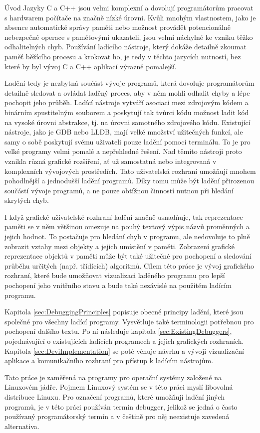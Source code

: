 \documentclass[bc,male,python,dept460]{diploma}						%
\newcommand{\parspace}[1][]{
	\ifthenelse{\isempty{#1}}{\vspace{5mm}}{\vspace{#1}}
	\par
}
\begin{document}
\begin{section}{Úvod}
	Jazyky C a C++ jsou velmi komplexní a dovolují programátorům pracovat s hardwarem počítače na značně nízké úrovni. Kvůli mnohým vlastnostem,
	jako je absence automatické správy paměti nebo možnost provádět potencionálně nebezpečné operace s paměťovými ukazateli, jsou velmi náchylné ke vzniku
	těžko odhalitelných chyb. Používání ladícího nástroje, který dokáže detailně zkoumat paměť běžícího procesu a krokovat ho, je tedy v těchto jazycích nutností,
	bez které by byl vývoj C a C++ aplikací výrazně pomalejší.

	\parspace Ladění tedy je nezbytná součást vývoje programů, která dovoluje programátorům detailně sledovat a ovládat laděný proces, aby v něm mohli odhalit
	chyby a lépe pochopit jeho průběh. Ladící nástroje vytváří asociaci mezi zdrojovým kódem a binárním spustitelným
	souborem a poskytují tak tvůrci kódu možnost ladit kód na vysoké úrovni abstrakce, tj. na úrovni samotného zdrojového kódu.
	Existující nástroje, jako je GDB nebo LLDB, mají velké množství užitečných funkcí, ale samy o sobě poskytují svému uživateli pouze ladění
	pomocí terminálu. To je pro velké programy velmi pomalé a nepřehledné řešení. Nad těmito nástroji proto vznikla různá grafické rozšíření,
	ať už samostatná nebo integrovaná v komplexních vývojových prostředích. Tato uživatelská rozhraní umožňují mnohem pohodlnější a jednodušší ladění programů.
	Díky tomu může být ladění přirozenou součástí vývoje programů, a ne pouze obtížnou činností nutnou při hledání skrytých chyb.
	
	\parspace I když grafické uživatelské rozhraní ladění značně usnadňuje, tak reprezentace paměti se v něm většinou omezuje na pouhý textový výpis názvů proměnných
	a jejich hodnot. To postačuje pro hledání chyb v programu, ale nedovoluje to plně zobrazit vztahy mezi objekty a jejich umístění v paměti.
	Zobrazení grafické reprezentace objektů v paměti může být také užitečné pro pochopení a sledování průběhu určitých (např. třídících) algoritmů.
	Cílem této práce je vývoj grafického rozhraní, které bude umožňovat vizualizaci laděného programu pro lepší pochopení jeho vnitřního stavu a bude také nezávislé
	na použitém ladícím programu.	

	\parspace Kapitola \ref{sec:DebuggingPrinciples} popisuje obecné principy ladění, které jsou společné pro všechny ladící programy. Vysvětluje také terminologii
	potřebnou pro pochopení dalšího textu. Po ní následuje kapitola \ref{sec:ExistingDebuggers}, pojednávající o existujících
	ladících programech a jejich grafických rozhraních. Kapitola \ref{sec:DeviImplementation} se poté věnuje návrhu a vývoji vizualizační aplikace a
	komunikačního rozhraní pro přístup k ladícím nástrojům.
	
	\parspace Tato práce je zaměřená na programy pro operační systémy založené na Linuxovém jádře. Pojmem Linuxový systém se v této práci myslí
	libovolná distribuce Linuxu. Pro označení programů, které umožňují ladění jiných programů, je v této práci používán termín debugger,
	jelikož se jedná o často používaný programátorský termín a v češtině pro něj neexistuje zavedená alternativa.
\end{section}
\end{document}
